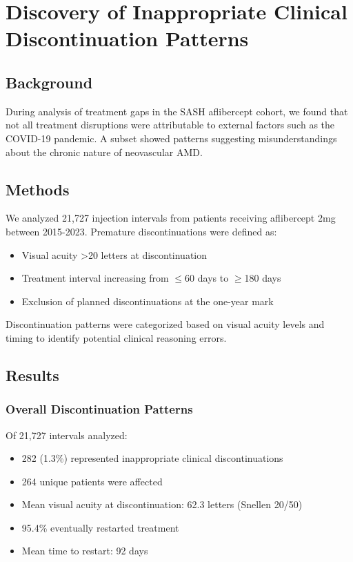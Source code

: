 \section{Discovery of Inappropriate Clinical Discontinuation Patterns}

\subsection{Background}

During analysis of treatment gaps in the SASH aflibercept cohort, we found that not all treatment disruptions were attributable to external factors such as the COVID-19 pandemic. A subset showed patterns suggesting misunderstandings about the chronic nature of neovascular AMD.

\subsection{Methods}

We analyzed 21,727 injection intervals from patients receiving aflibercept 2mg between 2015-2023. Premature discontinuations were defined as:

\begin{itemize}
    \item Visual acuity >20 letters at discontinuation
    \item Treatment interval increasing from $\leq$60 days to $\geq$180 days
    \item Exclusion of planned discontinuations at the one-year mark
\end{itemize}

Discontinuation patterns were categorized based on visual acuity levels and timing to identify potential clinical reasoning errors.

\subsection{Results}

\subsubsection{Overall Discontinuation Patterns}

Of 21,727 intervals analyzed:
\begin{itemize}
    \item 282 (1.3\%) represented inappropriate clinical discontinuations
    \item 264 unique patients were affected
    \item Mean visual acuity at discontinuation: 62.3 letters (Snellen 20/50)
    \item 95.4\% eventually restarted treatment
    \item Mean time to restart: 92 days
\end{itemize}

